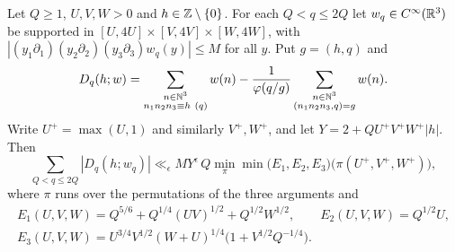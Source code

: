 \documentclass[11pt,colorlinks]{charlie}
\begin{document}
\begin{proposition}\label{prop:smoothdisc}
Let $Q\ge1$, $U,V,W>0$ and $h\in\mathbb{Z}\setminus\{0\}$. For each $Q<q\le2Q$ let $w_q\in C^\infty(\mathbb{R}^3)$ be supported in $[U,4U]\times[V,4V]\times[W,4W]$, with $|(y_1\partial_1)(y_2\partial_2)(y_3\partial_3)w_q(y)|\le M$ for all $y$. Put $g=(h,q)$ and
\[
 D_q(h;w)=\sum_{\substack{n\in\N^3\\ n_1n_2n_3\equiv h\ (q)}}w(n)-\frac1{\varphi(q/g)}\sum_{\substack{n\in\N^3\\(n_1n_2n_3,q)=g}}w(n).
\]
Write $U^+=\max(U,1)$ and similarly $V^+,W^+$, and let $Y=2+QU^+V^+W^+|h|$. Then
\[
 \sum_{Q<q\le2Q}|D_q(h;w_q)|\ll_\epsilon MY^\epsilon\,Q\min_\pi\min\big(E_1,E_2,E_3\big)\big(\pi(U^+,V^+,W^+)\big),
\]
where $\pi$ runs over the permutations of the three arguments and
\begin{gather*}
 E_1(U,V,W)=Q^{5/6}+Q^{1/4}(UV)^{1/2}+Q^{1/2}W^{1/2},\qquad E_2(U,V,W)=Q^{1/2}U,\\
 E_3(U,V,W)=U^{3/4}V^{1/2}(W+U)^{1/4}\big(1+V^{1/2}Q^{-1/4}\big).
\end{gather*}
\end{proposition}
\end{document}
